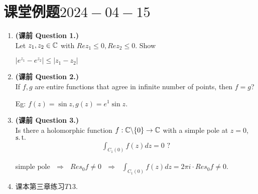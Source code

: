 \section{课堂例题$2024-04-15$}
\begin{enumerate}
	\item \textbf{(课前 Question 1.)} \\
	Let $z_1 , z_2 \in \mathbb{C}$ with $Rez_1 \leq 0 , Rez_2 \leq 0$. Show
	\begin{center}
		$\left| e^{z_1} - e^{z_2} \right| \leq \left| z_1 - z_2 \right|$
	\end{center}

	\vspace{2em}
	
	\item \textbf{(课前 Question 2.)} \\
	If $f , g$ are entire functions that agree in infinite number of points, then $f = g$?
	
	\vspace{2em}
	\begin{solution}
		Eg: $f(z) = \sin{z} , g(z) = e^1 \sin{z}$.
	\end{solution}
	
	\vspace{2em}
	
	\item \textbf{(课前 Question 3.)} \\
	Is there a holomorphic function $f : \mathbb{C} \backslash \{ 0 \} \rightarrow \mathbb{C}$ with a simple pole at $z = 0$, $\operatorname{s.t.}$
	\begin{align}
		\int_{C_{1}(0)}{f(z) dz} = 0 \,\, ?
	\end{align}

	\vspace{2em}
	\begin{solution}
		simple pole $\,\, \Rightarrow \,\,$ $Res_{0}f \neq 0$ $\,\, \Rightarrow \,\,$ $\int_{C_{1}(0)}{f(z) dz} = 2 \pi i \cdot Res_{0}f \neq 0$.
	\end{solution}

	\vspace{2em}
	
	\item 课本第三章练习$T13$.
\end{enumerate}







	\ifx\allfiles\undefined

\fi